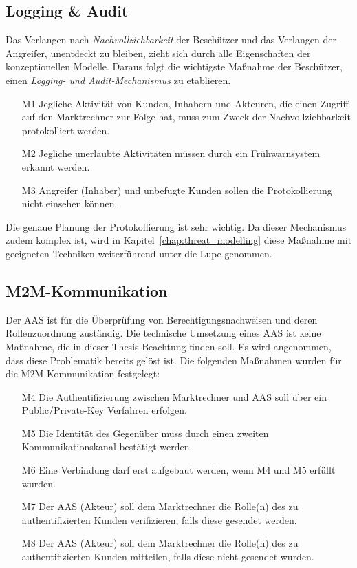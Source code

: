 \documentclass[11pt,a4paper]{report}
\begin{document}
\subsection{Logging \& Audit}
Das Verlangen nach \textit{Nachvollziehbarkeit} der Beschützer und das Verlangen der Angreifer, unentdeckt zu bleiben, zieht sich durch alle Eigenschaften der konzeptionellen Modelle. Daraus folgt die wichtigste Maßnahme der Beschützer, einen \textit{Logging- und Audit-Mechanismus} zu etablieren.

\begin{enumerate}
\item[M1] Jegliche Aktivität von Kunden, Inhabern und Akteuren, die einen Zugriff auf den Marktrechner zur Folge hat, muss zum Zweck der Nachvollziehbarkeit protokolliert werden.
\item[M2] Jegliche unerlaubte Aktivitäten müssen durch ein Frühwarnsystem erkannt werden.
\item[M3] Angreifer (Inhaber) und unbefugte Kunden sollen die Protokollierung nicht einsehen können.
\end{enumerate}

Die genaue Planung der Protokollierung ist sehr wichtig. Da dieser Mechanismus zudem komplex ist, wird in Kapitel~\ref{chap:threat_modelling} diese Maßnahme mit geeigneten Techniken weiterführend unter die Lupe genommen.

\subsection{M2M-Kommunikation} \label{m2m_comm} 
Der AAS ist für die Überprüfung von Berechtigungsnachweisen und deren Rollenzuordnung zuständig. Die technische Umsetzung eines AAS ist keine Maßnahme, die in dieser Thesis Beachtung finden soll. Es wird angenommen, dass diese Problematik bereits gelöst ist. Die folgenden Maßnahmen wurden für die M2M-Kommunikation festgelegt:

\begin{enumerate}
\item[M4] Die Authentifizierung zwischen Marktrechner und AAS soll über ein Public/Private-Key Verfahren erfolgen.
\item[M5] Die Identität des Gegenüber muss durch einen zweiten Kommunikationskanal bestätigt werden.
\item[M6] Eine Verbindung darf erst aufgebaut werden, wenn M4 und M5 erfüllt wurden.
\item[M7] Der AAS (Akteur) soll dem Marktrechner die Rolle(n) des zu authentifizierten Kunden verifizieren, falls diese gesendet werden.
\item[M8] Der AAS (Akteur) soll dem Marktrechner die Rolle(n) des zu authentifizierten Kunden mitteilen, falls diese nicht gesendet wurden.
\end{enumerate}
\end{document}
